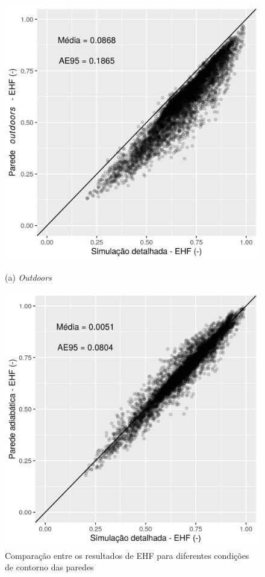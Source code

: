\documentclass[brazil,hardcopy,openany]{ufscthesis} %
\begin{document}
\begin{figure}[h]
	\caption{Comparação entre os resultados de EHF para diferentes condições de contorno das paredes}
	\begin{minipage}{.5\textwidth}
		\includegraphics[width=\linewidth]{img/szout_EHF_scatter.png}
		\begin{center}
			\small{(a) \textit{Outdoors}}
		\end{center}
	\end{minipage}%
	\begin{minipage}{.5\textwidth}
		\includegraphics[width=\linewidth]{img/szadi_EHF_scatter.png}

\end{minipage}
\end{figure}
\end{document}
